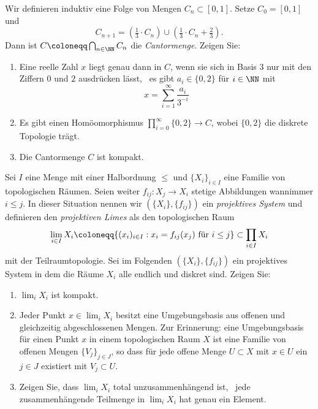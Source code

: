 \begin{exercise}
Wir definieren induktiv eine Folge von Mengen $C_n\subset [0,1]$. Setze $C_0 = [0,1]$ und
\[
C_{n+1} = \left(\tfrac{1}{3}\cdot C_n\right) \cup \left(\tfrac{1}{3}\cdot C_n + \tfrac{2}{3}\right).
\]
Dann ist $C\coloneqq \bigcap_{n\in\NN} C_n$ die \emph{Cantormenge}. Zeigen Sie:
\begin{enumerate}
\item Eine reelle Zahl $x$ liegt genau dann in $C$, wenn sie sich in Basis $3$ nur mit den Ziffern $0$ und $2$ ausdrücken lässt, \ddh~es gibt $a_i\in\{0,2\}$ für $i\in \NN$ mit
\[
x = \sum_{i=1}^\infty \frac{a_i}{3^{-i}}
\]
\item Es gibt einen Homöomorphismus $\prod_{i=0}^\infty\{0,2\} \to C$, wobei $\{0,2\}$ die diskrete Topologie trägt.
\item Die Cantormenge $C$ ist kompakt.
\end{enumerate}
\end{exercise}

\begin{exercise}
Sei $I$ eine Menge mit einer Halbordnung $\leq$ und $\{X_i\}_{i\in I}$ eine Familie von topologischen Räumen. Seien weiter $f_{ij}\colon X_j\to X_i$ stetige Abbildungen wannimmer $i\leq j$. In dieser Situation nennen wir $(\{X_i\}, \{f_{ij}\})$ ein \emph{projektives System} und definieren den \emph{projektiven Limes} als den topologischen Raum
\[
\lim_{i\in I} X_i \coloneqq \{(x_i)_{i\in I} : \textnormal{$x_i = f_{ij}(x_j)$ für $i\leq j$}\}\subset \prod_{i\in I} X_i
\]
mit der Teilraumtopologie. Sei im Folgenden $(\{X_i\},\{f_{ij}\})$ ein projektives System in dem die Räume $X_i$ alle endlich und diskret sind. Zeigen Sie:
\begin{enumerate}
\item $\lim_{i} X_i$ ist kompakt.
\item Jeder Punkt $x\in \lim_i X_i$ besitzt eine Umgebungsbasis aus offenen und gleichzeitig abgeschlossenen Mengen. {\footnotesize Zur Erinnerung: eine Umgebungsbasis für einen Punkt $x$ in einem topologischen Raum $X$ ist eine Familie von offenen Mengen $\{V_j\}_{j\in J}$, so dass für jede offene Menge $U\subset X$ mit $x\in U$ ein $j\in J$ existiert mit $V_j\subset U$.}
\item Zeigen Sie, dass $\lim_i X_i$ total unzusammenhängend ist, \ddh~jede zusammenhängende Teilmenge in $\lim_i X_i$ hat genau ein Element.
\end{enumerate}
\end{exercise}

